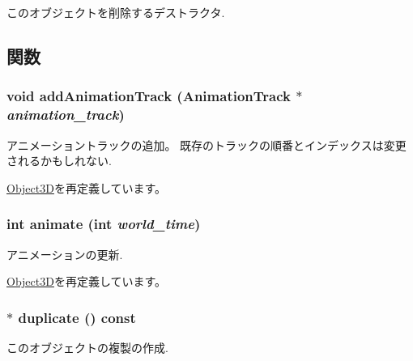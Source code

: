 このオブジェクトを削除するデストラクタ. 

\subsection{関数}
\hypertarget{classm3g_1_1Fog_415c0b110f95410ded9b85e5d99a496b}{
\subsubsection[{addAnimationTrack}]{\setlength{\rightskip}{0pt plus 5cm}void addAnimationTrack ({\bf AnimationTrack} $\ast$ {\em animation\_\-track})}}
\label{classm3g_1_1Fog_415c0b110f95410ded9b85e5d99a496b}


アニメーショントラックの追加。 既存のトラックの順番とインデックスは変更されるかもしれない. 

\hyperlink{classm3g_1_1Object3D_415c0b110f95410ded9b85e5d99a496b}{Object3D}を再定義しています。\hypertarget{classm3g_1_1Fog_8aad1ceab4c2a03609c8a42324ce484d}{
\subsubsection[{animate}]{\setlength{\rightskip}{0pt plus 5cm}int animate (int {\em world\_\-time})}}
\label{classm3g_1_1Fog_8aad1ceab4c2a03609c8a42324ce484d}


アニメーションの更新. 

\hyperlink{classm3g_1_1Object3D_8aad1ceab4c2a03609c8a42324ce484d}{Object3D}を再定義しています。\hypertarget{classm3g_1_1Fog_d46dc959a547ee3a804fc871b83c0bbf}{
\subsubsection[{duplicate}]{ $\ast$ duplicate () const}}
\label{classm3g_1_1Fog_d46dc959a547ee3a804fc871b83c0bbf}


このオブジェクトの複製の作成. 


